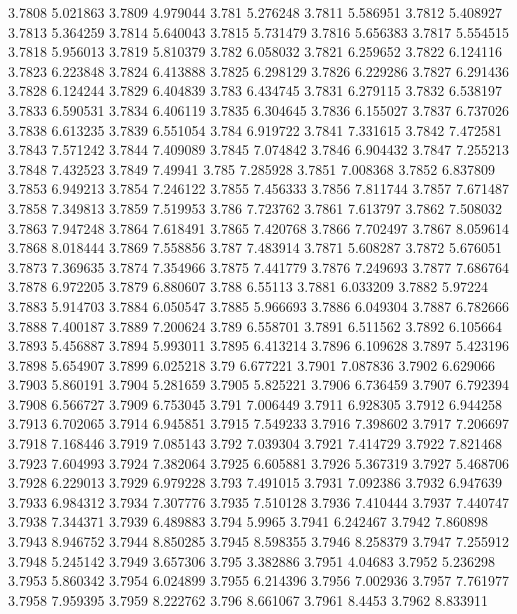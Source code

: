 3.7808  5.021863
3.7809  4.979044
3.781  5.276248
3.7811  5.586951
3.7812  5.408927
3.7813  5.364259
3.7814  5.640043
3.7815  5.731479
3.7816  5.656383
3.7817  5.554515
3.7818  5.956013
3.7819  5.810379
3.782  6.058032
3.7821  6.259652
3.7822  6.124116
3.7823  6.223848
3.7824  6.413888
3.7825  6.298129
3.7826  6.229286
3.7827  6.291436
3.7828  6.124244
3.7829  6.404839
3.783  6.434745
3.7831  6.279115
3.7832  6.538197
3.7833  6.590531
3.7834  6.406119
3.7835  6.304645
3.7836  6.155027
3.7837  6.737026
3.7838  6.613235
3.7839  6.551054
3.784  6.919722
3.7841  7.331615
3.7842  7.472581
3.7843  7.571242
3.7844  7.409089
3.7845  7.074842
3.7846  6.904432
3.7847  7.255213
3.7848  7.432523
3.7849  7.49941
3.785  7.285928
3.7851  7.008368
3.7852  6.837809
3.7853  6.949213
3.7854  7.246122
3.7855  7.456333
3.7856  7.811744
3.7857  7.671487
3.7858  7.349813
3.7859  7.519953
3.786  7.723762
3.7861  7.613797
3.7862  7.508032
3.7863  7.947248
3.7864  7.618491
3.7865  7.420768
3.7866  7.702497
3.7867  8.059614
3.7868  8.018444
3.7869  7.558856
3.787  7.483914
3.7871  5.608287
3.7872  5.676051
3.7873  7.369635
3.7874  7.354966
3.7875  7.441779
3.7876  7.249693
3.7877  7.686764
3.7878  6.972205
3.7879  6.880607
3.788  6.55113
3.7881  6.033209
3.7882  5.97224
3.7883  5.914703
3.7884  6.050547
3.7885  5.966693
3.7886  6.049304
3.7887  6.782666
3.7888  7.400187
3.7889  7.200624
3.789  6.558701
3.7891  6.511562
3.7892  6.105664
3.7893  5.456887
3.7894  5.993011
3.7895  6.413214
3.7896  6.109628
3.7897  5.423196
3.7898  5.654907
3.7899  6.025218
3.79  6.677221
3.7901  7.087836
3.7902  6.629066
3.7903  5.860191
3.7904  5.281659
3.7905  5.825221
3.7906  6.736459
3.7907  6.792394
3.7908  6.566727
3.7909  6.753045
3.791  7.006449
3.7911  6.928305
3.7912  6.944258
3.7913  6.702065
3.7914  6.945851
3.7915  7.549233
3.7916  7.398602
3.7917  7.206697
3.7918  7.168446
3.7919  7.085143
3.792  7.039304
3.7921  7.414729
3.7922  7.821468
3.7923  7.604993
3.7924  7.382064
3.7925  6.605881
3.7926  5.367319
3.7927  5.468706
3.7928  6.229013
3.7929  6.979228
3.793  7.491015
3.7931  7.092386
3.7932  6.947639
3.7933  6.984312
3.7934  7.307776
3.7935  7.510128
3.7936  7.410444
3.7937  7.440747
3.7938  7.344371
3.7939  6.489883
3.794  5.9965
3.7941  6.242467
3.7942  7.860898
3.7943  8.946752
3.7944  8.850285
3.7945  8.598355
3.7946  8.258379
3.7947  7.255912
3.7948  5.245142
3.7949  3.657306
3.795  3.382886
3.7951  4.04683
3.7952  5.236298
3.7953  5.860342
3.7954  6.024899
3.7955  6.214396
3.7956  7.002936
3.7957  7.761977
3.7958  7.959395
3.7959  8.222762
3.796  8.661067
3.7961  8.4453
3.7962  8.833911
